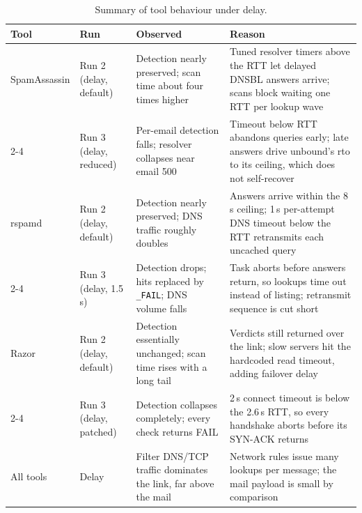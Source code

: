 \begin{table}[H]\centering
\scriptsize
\renewcommand{\arraystretch}{1.3}
\begin{tabular}{@{}p{1.5cm} p{2.1cm} p{4.0cm} p{4.6cm}@{}}
\toprule
\textbf{Tool} & \textbf{Run} & \textbf{Observed} & \textbf{Reason} \\
\midrule

SpamAssassin & Run 2 (delay, default) &
Detection nearly preserved; scan time about four times higher &
Tuned resolver timers above the RTT let delayed DNSBL answers arrive; scans block waiting one RTT per lookup wave \\
\cmidrule(l){2-4}
& Run 3 (delay, reduced) &
Per-email detection falls; resolver collapses near email 500 &
Timeout below RTT abandons queries early; late answers drive unbound's rto to its ceiling, which does not self-recover \\
\midrule

rspamd & Run 2 (delay, default) &
Detection nearly preserved; DNS traffic roughly doubles &
Answers arrive within the 8\,s ceiling; 1\,s per-attempt DNS timeout below the RTT retransmits each uncached query \\
\cmidrule(l){2-4}
& Run 3 (delay, 1.5\,s) &
Detection drops; hits replaced by \texttt{\_FAIL}; DNS volume falls &
Task aborts before answers return, so lookups time out instead of listing; retransmit sequence is cut short \\
\midrule

Razor & Run 2 (delay, default) &
Detection essentially unchanged; scan time rises with a long tail &
Verdicts still returned over the link; slow servers hit the hardcoded read timeout, adding failover delay \\
\cmidrule(l){2-4}
& Run 3 (delay, patched) &
Detection collapses completely; every check returns FAIL &
2\,s connect timeout is below the 2.6\,s RTT, so every handshake aborts before its SYN-ACK returns \\
\midrule

All tools & Delay &
Filter DNS/TCP traffic dominates the link, far above the mail &
Network rules issue many lookups per message; the mail payload is small by comparison \\

\bottomrule
\end{tabular}
\caption{Summary of tool behaviour under delay.}
\label{tab:results-summary}
\end{table}






